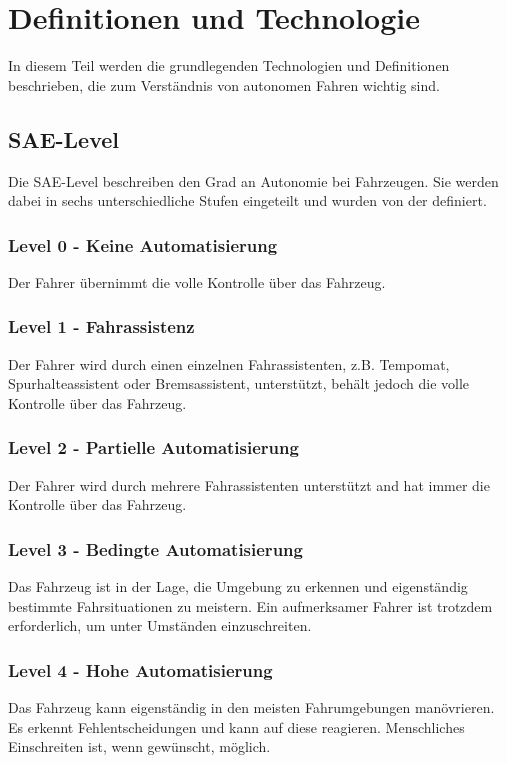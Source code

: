 

\section{Definitionen und Technologie}
\label{sec:definitionen-und-technologie}

In diesem Teil werden die grundlegenden Technologien und Definitionen beschrieben, die zum Verständnis von autonomen Fahren wichtig sind.

\subsection{SAE-Level}
\label{ssec:sae-level}

Die SAE-Level \cite{standardSAE} beschreiben den Grad an Autonomie bei Fahrzeugen. Sie werden dabei in sechs unterschiedliche Stufen eingeteilt und wurden von der \citeauthor{standardSAE} definiert.\\

\subsubsection*{Level 0 - Keine Automatisierung} Der Fahrer übernimmt die volle Kontrolle über das Fahrzeug.

\subsubsection*{Level 1 - Fahrassistenz} Der Fahrer wird durch einen einzelnen Fahrassistenten, z.B. Tempomat, Spurhalteassistent oder Bremsassistent, unterstützt, behält jedoch die volle Kontrolle über das Fahrzeug.

\subsubsection*{Level 2 - Partielle Automatisierung} Der Fahrer wird durch mehrere Fahrassistenten unterstützt and hat immer die Kontrolle über das Fahrzeug.
    
\subsubsection*{Level 3 - Bedingte Automatisierung} Das Fahrzeug ist in der Lage, die Umgebung zu erkennen und eigenständig bestimmte Fahrsituationen zu meistern. Ein aufmerksamer Fahrer ist trotzdem erforderlich, um unter Umständen einzuschreiten.

\subsubsection*{Level 4 - Hohe Automatisierung} Das Fahrzeug kann eigenständig in den meisten Fahrumgebungen manövrieren. Es erkennt Fehlentscheidungen und kann auf diese reagieren. Menschliches Einschreiten ist, wenn gewünscht, möglich.

